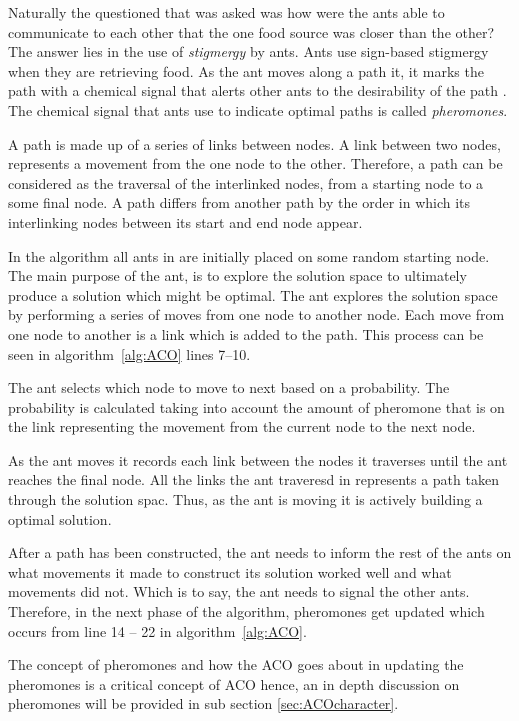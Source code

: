 Naturally the questioned that was asked was how were the ants able to communicate to each other that the one food source was closer than the other? The answer lies in the use of \emph{stigmergy} \label{def:stigmergy} by ants. Ants use sign-based stigmergy when they are retrieving food. As the ant moves along a path it, it marks the path with a chemical signal that alerts other ants to the desirability of the path \cite{CompuIntelligenceIntro}. The chemical signal that ants use to indicate optimal paths is called \emph{pheromones}.

A path is made up of a series of links between nodes. A link between two nodes, represents a movement from the one node to the other. Therefore, a path can be considered as the traversal of the interlinked nodes, from a starting node to a some final node. A path differs from another path by the order in which its interlinking nodes between its start and end node appear.

In the algorithm all ants in are initially placed on some random starting node. The main purpose of the ant, is to explore the solution space to ultimately produce a solution which might be optimal. The ant explores the solution space by performing a series of moves from one node to another node. Each move from one node to another is a link which is added to the path. This process can be seen in algorithm~\ref{alg:ACO} lines 7--10.

The ant selects which node to move to next based on a probability. The probability is calculated taking into account the amount of pheromone that is on the link representing the movement from the current node to the next node\cite{CompuIntelligenceIntro,FundamentalSwarm}.

As the ant moves it records each link between the nodes it traverses until the ant reaches the final node. All the links the ant traveresd in represents a path taken through the solution spac\cite{CompuIntelligenceIntro,FundamentalSwarm}. Thus, as the ant is moving it is actively building a optimal solution.

After a path has been constructed, the ant needs to inform the rest of the ants on what movements it made to construct its solution worked well and what movements did not. Which is to say, the ant needs to signal the other ants. Therefore, in the next phase of the algorithm, pheromones get updated which occurs from line 14 -- 22 in algorithm~\ref{alg:ACO}.

The concept of pheromones and how the ACO goes about in updating the pheromones is a critical concept of ACO hence, an in depth discussion on pheromones will be provided in sub section \ref{sec:ACOcharacter}.

